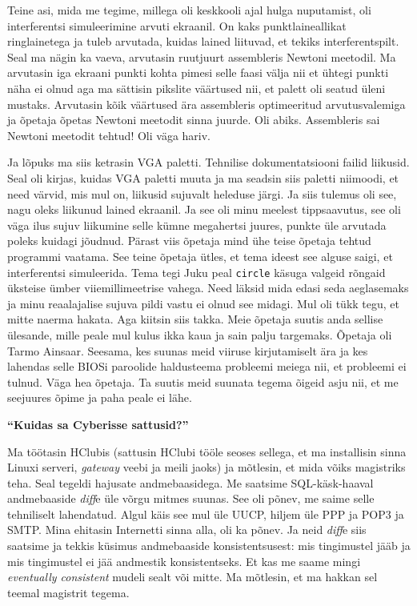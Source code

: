 Teine asi, mida me tegime, millega oli keskkooli ajal hulga nuputamist, oli
interferentsi simuleerimine arvuti ekraanil. On kaks punktlaineallikat
ringlainetega ja tuleb arvutada, kuidas lained liituvad, et tekiks
interferentspilt. Seal ma nägin ka vaeva, arvutasin ruutjuurt
assembleris Newtoni meetodil. Ma arvutasin iga ekraani
punkti kohta pimesi selle faasi välja nii et ühtegi punkti näha ei olnud aga ma
sättisin pikslite väärtused nii, et palett oli seatud üleni mustaks. Arvutasin
kõik väärtused ära assembleris optimeeritud arvutusvalemiga ja õpetaja õpetas
Newtoni meetodit sinna juurde. Oli abiks. Assembleris sai Newtoni meetodit
tehtud! Oli väga hariv.

Ja lõpuks ma siis ketrasin VGA paletti. Tehnilise dokumentatsiooni failid
liikusid. Seal oli kirjas, kuidas VGA paletti muuta ja ma seadsin siis paletti
niimoodi, et need värvid, mis mul on, liikusid sujuvalt heleduse järgi. Ja siis
tulemus oli see, nagu oleks liikunud lained ekraanil. Ja see oli minu meelest
tippsaavutus, see oli väga ilus sujuv liikumine selle kümne megahertsi juures,
punkte üle arvutada poleks kuidagi jõudnud. Pärast viis õpetaja mind ühe teise
õpetaja tehtud programmi vaatama. See teine õpetaja ütles, et tema ideest see
alguse saigi, et interferentsi simuleerida. Tema tegi Juku peal \verb|circle|
käsuga valgeid rõngaid üksteise ümber viiemillimeetrise vahega. Need läksid
mida edasi seda aeglasemaks ja minu reaalajalise sujuva pildi vastu ei olnud
see midagi. Mul oli tükk tegu, et mitte naerma hakata. Aga kiitsin siis takka.
Meie õpetaja suutis anda sellise ülesande, mille peale mul kulus ikka kaua ja
sain palju targemaks. Õpetaja oli Tarmo Ainsaar.
Seesama, kes suunas meid viiruse kirjutamiselt ära ja kes lahendas selle BIOSi
paroolide haldusteema probleemi meiega nii, et probleemi ei tulnud. Väga hea
õpetaja. Ta suutis meid suunata tegema õigeid asju nii, et me seejuures õpime
ja paha peale ei lähe.

\textbf{\enquote{Kuidas sa Cyberisse sattusid?}}

Ma töötasin HClubis (sattusin HClubi tööle seoses sellega, et ma
installisin sinna Linuxi serveri, \emph{gateway} veebi ja meili jaoks) ja
mõtlesin, et mida võiks magistriks teha. Seal tegeldi hajusate andmebaasidega.
Me saatsime SQL-käsk-haaval andmebaaside \emph{diff}e üle võrgu mitmes suunas.
See oli põnev, me saime selle tehniliselt lahendatud. Algul käis see mul üle
UUCP, hiljem üle PPP ja POP3 ja SMTP. Mina ehitasin Internetti sinna alla, oli
ka põnev. Ja neid \emph{diff}e siis saatsime ja tekkis küsimus andmebaaside
konsistentsusest: mis tingimustel jääb ja mis tingimustel ei jää andmestik
konsistentseks. Et kas me saame mingi \emph{eventually consistent} mudeli sealt
või mitte. Ma mõtlesin, et ma hakkan sel teemal magistrit tegema.


